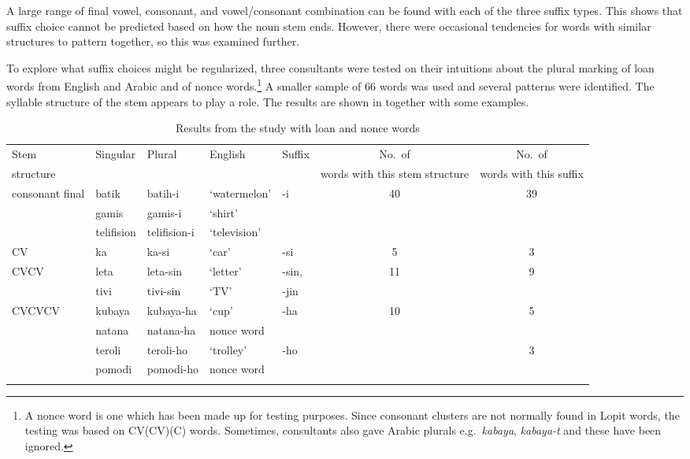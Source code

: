 \documentclass[output=paper]{langsci/langscibook}
\begin{document}
A large range of final vowel, consonant, and vowel/consonant combination can be found with each of the three suffix types. This shows that suffix choice cannot be predicted based on how the noun stem ends. However, there were occasional tendencies for words with similar structures to pattern together, so this was examined further.

To explore what suffix choices might be regularized, three consultants were tested on their intuitions about the plural marking of loan words from English and Arabic and of nonce words.\footnote{A nonce word is one which has been made up for testing purposes. Since consonant clusters are not normally found in Lopit words, the testing was based on CV(CV)(C) words. Sometimes, consultants also gave Arabic plurals e.g.\ \textit{kabaya}, \textit{kabaya-t} and these have been ignored.} A smaller sample of 66 words was used and several patterns were identified. The syllable structure of the stem appears to play a role. The results are shown in  together with some examples.

\begin{table}
\begin{tabularx}{\textwidth}{XllXlSS}
\lsptoprule

\small {Stem} & \small {Singular} & \small {Plural} & \small {English} & \small {Suffix} & \small {No.\ of}  & \small {No.\ of} \\ [-.15em]
\small {structure} & & & & & \small {words with this stem structure} & \small {words with this suffix} \\ 
\midrule
 consonant final &  batik &  batih-i &  `water\-melon' &  -i &  40 &  39\\
\tablevspace
&  gamis &  gamis-i &  ‘shirt’ &  &  & \\
\tablevspace
&  telifision &  telifision-i &  ‘television’ &  &  & \\
\midrule
 CV &  ka &  ka-si &  ‘car’ &  -si &  5 &  3\\
\midrule
 CVCV &  leta &  leta-sin &  ‘letter’ & { -sin,}
 &  11 &  9\\
\tablevspace
&  tivi &  tivi-sin &  ‘TV’ &   -jin &  & \\
\midrule
 CVCVCV &  kubaya &  kubaya-ha &  ‘cup’ &  -ha &  10 &  5\\
&  natana &  natana-ha &  nonce word &  &  & \\
\tablevspace
&  teroli &  teroli-ho &  ‘trolley’ &  -ho &  &  3\\
\tablevspace
&  pomodi &  pomodi-ho &  nonce word &  &  & \\
\lspbottomrule
\end{tabularx}
\caption{Results from the study with loan and nonce words}
\label{tab:moodie:13}
\end{table}
\end{document}

